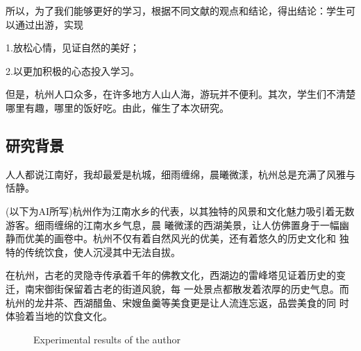 \documentclass[a4paper,12pt]{article}
\begin{document}
  所以，为了我们能够更好的学习，根据不同文献的观点和结论，得出结论：学生可以通过出游，实现

  1.放松心情，见证自然的美好；

  2.以更加积极的心态投入学习。

  但是，杭州人口众多，在许多地方人山人海，游玩并不便利。其次，学生们不清楚哪里有趣，哪里的饭好吃。由此，催生了本次研究。
  

\subsection{研究背景}
人人都说江南好，我却最爱是杭城，细雨缠绵，晨曦微漾，杭州总是充满了风雅与恬静。

(以下为AI所写)杭州作为江南水乡的代表，以其独特的风景和文化魅力吸引着无数游客。细雨缠绵的江南水乡气息，晨
曦微漾的西湖美景，让人仿佛置身于一幅幽静而优美的画卷中。杭州不仅有着自然风光的优美，还有着悠久的历史文化和
独特的传统饮食，使人沉浸其中无法自拔。

在杭州，古老的灵隐寺传承着千年的佛教文化，西湖边的雷峰塔见证着历史的变迁，南宋御街保留着古老的街道风貌，每
一处景点都散发着浓厚的历史气息。而杭州的龙井茶、西湖醋鱼、宋嫂鱼羹等美食更是让人流连忘返，品尝美食的同
时体验着当地的饮食文化。

\begin{figure}[htbp]
  \centering
  \quad
  
  \caption{Experimental results of the author}
  \end{figure}
\end{document}
